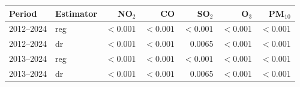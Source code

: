 \begin{tabular}{llrrrrr}
\toprule
Period & Estimator & NO$_2$ & CO & SO$_2$ & O$_3$ & PM$_{10}$ \\
\midrule
2012--2024 & reg & $<0.001$ & $<0.001$ & $<0.001$ & $<0.001$ & $<0.001$ \\
2012--2024 & dr & $<0.001$ & $<0.001$ & 0.0065 & $<0.001$ & $<0.001$ \\
2013--2024 & reg & $<0.001$ & $<0.001$ & $<0.001$ & $<0.001$ & $<0.001$ \\
2013--2024 & dr & $<0.001$ & $<0.001$ & 0.0065 & $<0.001$ & $<0.001$ \\
\bottomrule
\end{tabular}
